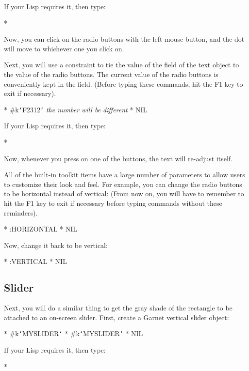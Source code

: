 If your Lisp requires it, then type:
\begin{programexample}
* 
\end{programexample}

Now, you can click on the radio buttons with the left mouse button, and the
dot will move to whichever one you click on.

Next, you will use a constraint to tie the value of the 
field of the text object to the value of the radio buttons.  The current
value of the radio buttons is conveniently kept in the  field.
(Before typing these commands, hit the F1 key to exit  
if necessary).

\begin{programexample}
* 
\#k{\tt\char`\<}F2312{\tt\char`\>}   {\it the number will be different}
* 
NIL
\end{programexample}
If your Lisp requires it, then type:
\begin{programexample}
* 
\end{programexample}

Now, whenever you press on one of the buttons, the text will re-adjust
itself.

All of the built-in toolkit items have a large number of parameters to
allow users to customize their look and feel.  For example, you can change
the radio buttons to be horizontal instead of vertical:
(From now on, you will have to remember to hit the F1 key to exit
 if necessary before typing commands without these
reminders).
\begin{programexample}
* 
:HORIZONTAL
* 
NIL
\end{programexample}

Now, change it back to be vertical:
\begin{programexample}
* 
:VERTICAL
* 
NIL
\end{programexample}

\subsection{Slider}

Next, you will do a similar thing to get the gray shade of the
rectangle to be attached to an on-screen slider.  First, create a Garnet
vertical slider object:
\begin{programexample}
* 
\#k{\tt\char`\<}MYSLIDER{\tt\char`\>}
* 
\#k{\tt\char`\<}MYSLIDER{\tt\char`\>}
* 
NIL
\end{programexample}
If your Lisp requires it, then type:
\begin{programexample}
* 
\end{programexample}

